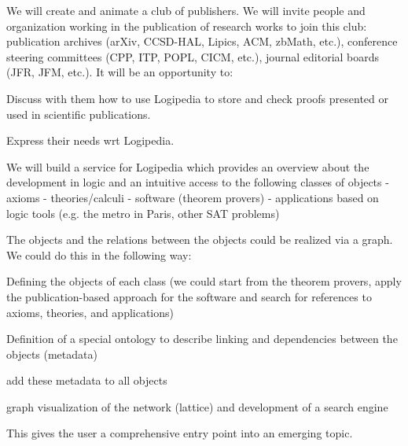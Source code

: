 \begin{workpackage}[id=dissemination,wphases=0-48,type=MGT,
  short=Dissemination,%
  title={Dissemination, communication and exploitation},
  lead=Inr]
\begin{tasklist}
\begin{task}[id=teachers-club,
      title=Expanding the use of Logipedia in education,
      lead=Str,StrRM=2]
  \end{task}

  \begin{task}[id=publishers-club,
      title=Expanding the use of Logipedia in publishing,
      lead=Zib,ZibRM=12]
    We will create and animate a club of publishers. We will invite
    people and organization working in the publication of research
    works to join this club: publication archives (arXiv, CCSD-HAL,
    Lipics, ACM, zbMath, etc.), conference steering committees (CPP,
    ITP, POPL, CICM, etc.), journal editorial boards (JFR, JFM,
    etc.). It will be an opportunity to:
    \begin{compactitem}
    \item Discuss with them how to use Logipedia to store and check
      proofs presented or used in scientific publications.
    \item Express their needs wrt Logipedia.
    \end{compactitem}
  \end{task}

  \begin{task}[id=zib,
      title=Expanding the use of Logipedia in publishing,
      lead=Zib,ZibRM=12]
    We will build a service for Logipedia which provides an overview
    about the development in logic and an intuitive access to the
    following classes of objects - axioms - theories/calculi -
    software (theorem provers) - applications based on logic tools
    (e.g. the metro in Paris, other SAT problems)

    The objects and the relations between the objects could be
    realized via a graph.  We could do this in the following way:
    \begin{compactitem}
    \item Defining the objects of each class (we could start from the
      theorem provers, apply the publication-based approach for the
      software and search for references to axioms, theories, and
      applications)
    \item Definition of a special ontology to describe linking and
      dependencies between the objects (metadata)
    \item add these metadata to all objects
    \item graph visualization of the network (lattice) and development
      of a search engine
    \end{compactitem}    
    This gives the user a comprehensive entry point into an emerging
    topic.
  \end{task}


\end{tasklist}
\end{workpackage}
